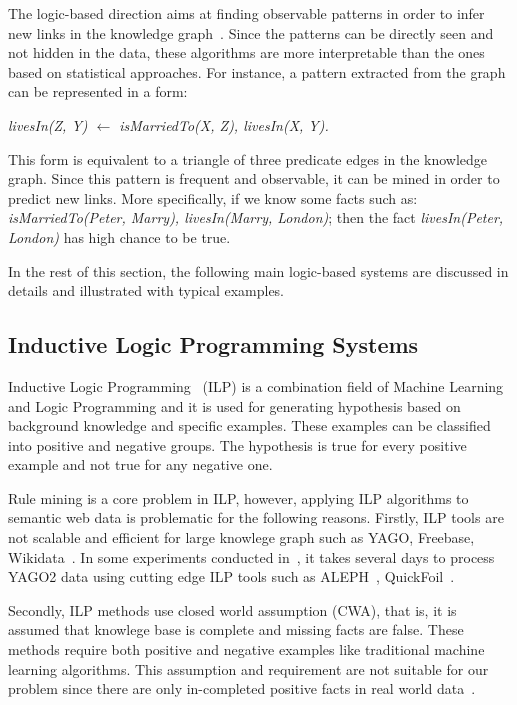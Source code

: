 The logic-based direction aims at finding observable patterns in order to infer new links in the knowledge graph~\cite{ref1}. Since the patterns can be directly seen and not hidden in the data, these algorithms are more interpretable than the ones based on statistical approaches. For instance, a pattern extracted from the graph can be represented in a form:\\

\centerline{\textit{livesIn(Z, Y) $\leftarrow$ isMarriedTo(X, Z), livesIn(X, Y).}}

This form is equivalent to a triangle of three predicate edges in the knowledge graph. Since this pattern is frequent and observable, it can be mined in order to predict new links. More specifically, if we know some facts such as: \textit{isMarriedTo(Peter, Marry), livesIn(Marry, London)}; then the fact \textit{livesIn(Peter, London)} has high chance to be true.

In the rest of this section, the following main logic-based systems are discussed in details and illustrated with typical examples.

\subsection{Inductive Logic Programming Systems}

Inductive Logic Programming~\cite{ref9} (ILP) is a combination field of Machine Learning and Logic Programming and it is used for generating hypothesis based on background knowledge and specific examples. These examples can be classified into positive and negative groups. The hypothesis is true for every positive example and not true for any negative one.

Rule mining is a core problem in ILP, however, applying ILP algorithms to semantic web data is problematic for the following reasons. Firstly, ILP tools are not scalable and efficient for large knowlege graph such as YAGO, Freebase, Wikidata~\cite{ref10}. In some experiments conducted in~\cite{ref10}, it takes several days to process YAGO2 data using cutting edge ILP tools such as ALEPH~\cite{ref14, ref10}, QuickFoil~\cite{ref15, ref10}.

Secondly, ILP methods use closed world assumption (CWA), that is, it is assumed that knowlege base is complete and missing facts are false. These methods require both positive and negative examples like traditional machine learning algorithms. This assumption and requirement are not suitable for our problem since there are only in-completed positive facts in real world data~\cite{ref10}.

